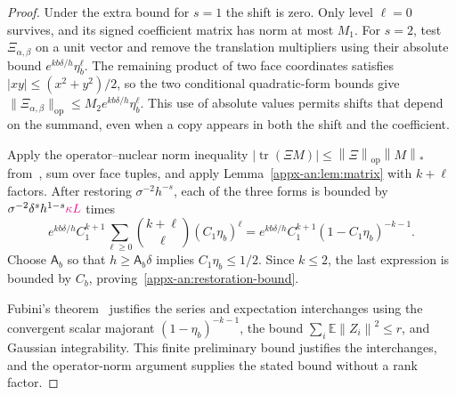 \documentclass[11pt,letterpaper]{article}
\newcommand{\vSix}[1]{{\color{magenta}#1}}
\theoremstyle{remark}
\newcommand{\E}{\mathbb E}
\newcommand{\tr}{\operatorname{tr}}
\newcommand{\op}{\mathrm{op}}
\newcommand{\norm}[1]{\left\lVert#1\right\rVert}
\begin{document}
\begin{proof}
Under the extra bound for $s=1$ the shift is zero. Only level $\ell=0$ survives, and its signed coefficient matrix has norm at most $M_1$. For $s=2$, test $\Xi_{\alpha,\beta}$ on a unit vector and remove the translation multipliers using their absolute bound $e^{kb\delta/h}\eta_b^\ell$. The remaining product of two face coordinates satisfies $|xy|\le(x^2+y^2)/2$, so the two conditional quadratic-form bounds give $\|\Xi_{\alpha,\beta}\|_{\op}\le M_2 e^{kb\delta/h}\eta_b^\ell$. This use of absolute values permits {shifts that depend on the summand, even when a copy appears} in both the shift and the coefficient.

Apply the operator--nuclear norm inequality
\(|\tr(\Xi M)|\le\norm\Xi_\op\norm M_*\)
from~\cite[Chapter~IV]{Bhatia1997}, sum over face
tuples, and apply Lemma~\ref{appx-an:lem:matrix} with \(k+\ell\) factors.
After restoring \(\sigma^{-2}h^{-s}\), each of the three forms
is bounded by \(\sigma^{-2}\delta^sh^{1-s}\vSix{\kappa L}\) times
\[
 e^{kb\delta/h}C_1^{k+1}
 \sum_{\ell\ge0}\binom{k+\ell}{\ell}(C_1\eta_b)^\ell
 =e^{kb\delta/h}C_1^{k+1}(1-C_1\eta_b)^{-k-1}.
\]
Choose \(\mathsf A_b\) so that \(h\ge\mathsf A_b\delta\) implies
\(C_1\eta_b\le1/2\). Since \(k\le2\), the last expression is
bounded by \(C_b\), proving~\eqref{appx-an:restoration-bound}.

Fubini's theorem~\cite[Section~2.5]{Folland1999} justifies the
series and expectation interchanges using the convergent scalar
majorant \((1-\eta_b)^{-k-1}\), the bound
\(\sum_i\E\norm{Z_i}^2\le r\), and Gaussian integrability.
This finite preliminary bound justifies the interchanges, and the
operator-norm argument supplies the stated bound without a rank factor.
\end{proof}
\end{document}
